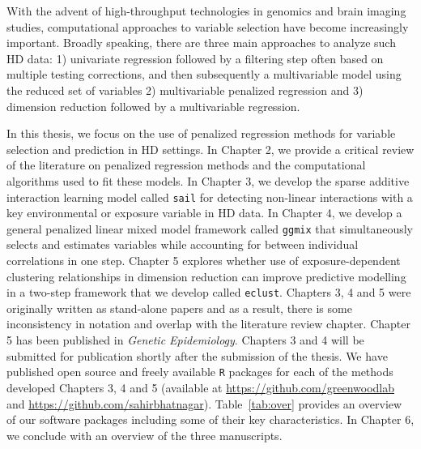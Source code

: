 With the advent of high-throughput technologies in genomics and brain imaging studies, computational approaches to variable selection have become increasingly important. Broadly speaking, there are three main approaches to analyze such HD data: 1) univariate regression followed by a filtering step often based on multiple testing corrections, and then subsequently a multivariable model using the reduced set of variables 2) multivariable penalized regression and 3) dimension reduction followed by a multivariable regression. 

In this thesis, we focus on the use of penalized regression methods for variable selection and prediction in HD settings. 
In Chapter 2, we provide a critical review of the literature on penalized regression methods and the computational algorithms used to fit these models. 
In Chapter 3, we develop the sparse additive interaction learning model called \texttt{sail} for detecting non-linear interactions with a key environmental or exposure variable in HD data. 
In Chapter 4, we develop a general penalized linear mixed model framework called \texttt{ggmix} that simultaneously selects and estimates variables while accounting for between individual correlations in one step. 
Chapter 5 explores whether use of exposure-dependent clustering relationships in dimension reduction can improve predictive modelling in a two-step framework that we develop called \texttt{eclust}. 
Chapters 3, 4 and 5 were originally written as stand-alone papers and as a result, there is some inconsistency in notation and overlap with the literature review chapter. Chapter 5 has been published in \textit{Genetic Epidemiology}. 
Chapters 3 and 4 will be submitted for publication shortly after the submission of the thesis. 
We have published open source and freely available \texttt{R} packages for each of the methods developed Chapters 3, 4 and 5 (available at \url{https://github.com/greenwoodlab} and \url{https://github.com/sahirbhatnagar}). 
Table~\ref{tab:over} provides an overview of our software packages including some of their key characteristics. 
In Chapter 6, we conclude with an overview of the three manuscripts.  



